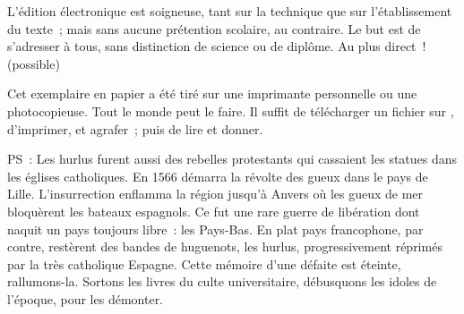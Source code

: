 \documentclass[french,twoside]{book} %
\newif\ifdev
\renewcommand{\LettrineFontHook}{\color{rubric}}
\newcommand{\initialiv}[2]{%
  \let\oldLFH\LettrineFontHook
  \IfSubStr{QJ’}{#1}{
    \lettrine[lines=4, lhang=0.2, loversize=-0.1, lraise=0.2]{\smash{#1}}{#2}
  }{\IfSubStr{É}{#1}{
    \lettrine[lines=4, lhang=0.2, loversize=-0, lraise=0]{\smash{#1}}{#2}
  }{\IfSubStr{ÀÂ}{#1}{
    \lettrine[lines=4, lhang=0.2, loversize=-0, lraise=0, slope=0.6em]{\smash{#1}}{#2}
  }{\IfSubStr{A}{#1}{
    \lettrine[lines=4, lhang=0.2, loversize=0.2, slope=0.6em]{\smash{#1}}{#2}
  }{\IfSubStr{V}{#1}{
    \lettrine[lines=4, lhang=0.2, loversize=0.2, slope=-0.5em]{\smash{#1}}{#2}
  }{
    \lettrine[lines=4, lhang=0.2, loversize=0.2]{\smash{#1}}{#2}
  }}}}}
  \let\LettrineFontHook\oldLFH
}
\renewcommand{\LettrineFontHook}{\bfseries\color{rubric}}
\begin{document}
  L’édition électronique est soigneuse, tant sur la technique
  que sur l’établissement du texte ; mais sans aucune prétention scolaire, au contraire.
  Le but est de s’adresser à tous, sans distinction de science ou de diplôme.
  Au plus direct ! (possible)
  \par

  Cet exemplaire en papier a été tiré sur une imprimante personnelle
   ou une photocopieuse. Tout le monde peut le faire.
  Il suffit de
  télécharger un fichier sur \href{https://hurlus.fr}{},
  d’imprimer, et agrafer ; puis de lire et donner.\par

  \bigskip

  \noindent PS : Les hurlus furent aussi des rebelles protestants qui cassaient les statues dans les églises catholiques. En 1566 démarra la révolte des gueux dans le pays de Lille. L’insurrection enflamma la région jusqu’à Anvers où les gueux de mer bloquèrent les bateaux espagnols.
  Ce fut une rare guerre de libération dont naquit un pays toujours libre : les Pays-Bas.
  En plat pays francophone, par contre, restèrent des bandes de huguenots, les hurlus, progressivement réprimés par la très catholique Espagne.
  Cette mémoire d’une défaite est éteinte, rallumons-la. Sortons les livres du culte universitaire, débusquons les idoles de l’époque, pour les démonter.
\fi

\ifdev %
\fontname\font — \textsc{Les règles du jeu}\par
(\hyperref[utopie]{\underline{Lien}})\par
\noindent \initialiv{A}{lors là}\blindtext\par
\noindent \initialiv{À}{ la bonheur des dames}\blindtext\par
\noindent \initialiv{É}{tonnez-le}\blindtext\par
\noindent \initialiv{Q}{ualitativement}\blindtext\par
\noindent \initialiv{V}{aloriser}\blindtext\par
\Blindtext
\phantomsection
\label{utopie}
\Blinddocument
\fi
\end{document}
